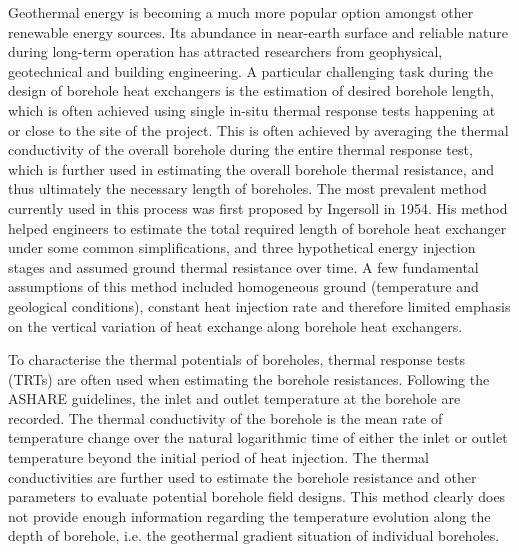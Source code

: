 Geothermal energy is becoming a much more popular option amongst other renewable energy sources. Its abundance in near-earth surface and reliable nature during long-term operation has attracted researchers from geophysical, geotechnical and building engineering. A particular challenging task during the design of borehole heat exchangers is the estimation of desired borehole length, which is often achieved using single in-situ thermal response tests happening at or close to the site of the project. This is often achieved by averaging the thermal conductivity of the overall borehole during the entire thermal response test, which is further used in estimating the overall borehole thermal resistance, and thus ultimately the necessary length of boreholes. The most prevalent method currently used in this process was first proposed by Ingersoll in 1954. His method helped engineers to estimate the total required length of borehole heat exchanger under some common simplifications, and three hypothetical energy injection stages and assumed ground thermal resistance over time. A few fundamental assumptions of this method included homogeneous ground (temperature and geological conditions), constant heat injection rate and therefore limited emphasis on the vertical variation of heat exchange along borehole heat exchangers. 


To characterise the thermal potentials of boreholes, thermal response tests (TRTs) are often used when estimating the borehole resistances. Following the ASHARE guidelines, the inlet and outlet temperature at the borehole are recorded. The thermal conductivity of the borehole is the mean rate of temperature change over the natural logarithmic time of either the inlet or outlet temperature beyond the initial period of heat injection. The thermal conductivities are further used to estimate the borehole resistance and other parameters to evaluate potential borehole field designs. This method clearly does not provide enough information regarding the temperature evolution along the depth of borehole, i.e. the geothermal gradient situation of individual boreholes. 

